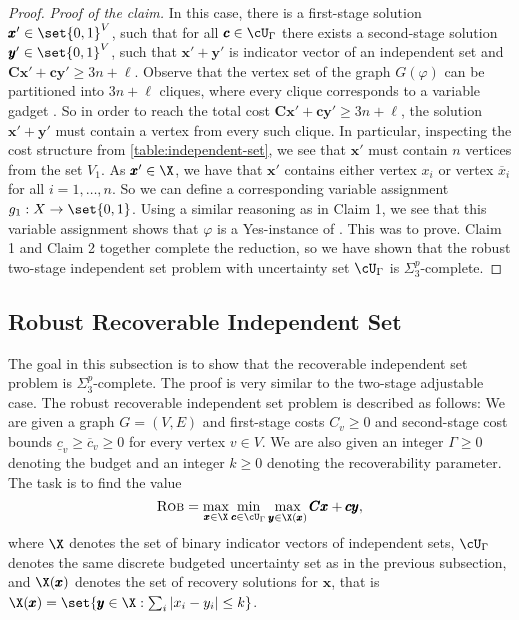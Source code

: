 \documentclass[a4paper,abstracton]{scrartcl}
\begin{document}
\begin{proof}
\emph{Proof of the claim.} 
In this case, there is a first-stage solution $\pmb x' \in \set{0,1}^V$, such that for all $\pmb c \in \cU_\Gamma$ there exists a second-stage solution $\pmb y' \in \set{0,1}^V$, 
such that $\pmb x'  + \pmb y'$ is indicator vector of an independent set and $\pmb C\pmb x' + \pmb c\pmb y' \geq 3n + \ell$. 
Observe that the vertex set of the graph $G(\varphi)$ can be partitioned into $3n + \ell$ cliques, where every clique corresponds to a variable gadget .
So in order to reach the total cost $\pmb C\pmb x' + \pmb c\pmb y' \geq 3n + \ell$, the solution $\pmb x' + \pmb y'$ must contain a vertex from every such clique. 
In particular, inspecting the cost structure from \cref{table:independent-set}, we see that $\pmb x'$ must contain $n$ vertices from the set $V_1$. 
As $\pmb x' \in \X$, we have that $\pmb x'$ contains either vertex $x_i$ or vertex $\overline{x}_i$ for all $i=1,\dots,n$. 
So we can define a corresponding variable assignment $g_1 : X \rightarrow \set{0,1}$. 
Using a similar reasoning as in Claim 1, we see that this variable assignment shows that $\varphi$ is a Yes-instance of {\radj}. 
This was to prove. Claim 1 and Claim 2 together complete the reduction, so we have shown that the robust two-stage independent set problem with uncertainty set $\cU_\Gamma$ is $\Sigma_3^p$-complete.
\end{proof}


\subsection{Robust Recoverable Independent Set}
\label{subsec:rec-ind-set}

The goal in this subsection is to show that the recoverable independent set problem is $\Sigma_3^p$-complete. 
The proof is very similar to the two-stage adjustable case. 
The robust recoverable independent set problem is described as follows: 
We are given a graph $G = (V,E)$ and first-stage costs $C_v \geq 0$ and second-stage cost bounds $\underline{c}_v \geq \overline{c}_v \geq 0$ for every vertex $v \in V$. 
We are also given an integer $\Gamma \geq 0$ denoting the budget and an integer $k \geq 0$ denoting the recoverability parameter. 
The task is to find the value 
\begin{equation}
 \textsc{Rob} = \max_{\pmb x  \in \X} \min_{\pmb c \in \cU_\Gamma } \max_{\pmb y \in \X(\pmb x) } \pmb C \pmb x + \pmb c \pmb y, \label{eq:recoverable-ind-set}
 \end{equation}
where $\X$ denotes the set of binary indicator vectors of independent sets, $\cU_\Gamma$ denotes the same discrete budgeted uncertainty set as in the previous subsection, and $\X(\pmb x)$ denotes the set of recovery solutions for $\pmb x$, that is $\X(\pmb x) = \set{\pmb y \in \X : \sum_i |x_i - y_i| \leq k}$.
\end{document}
